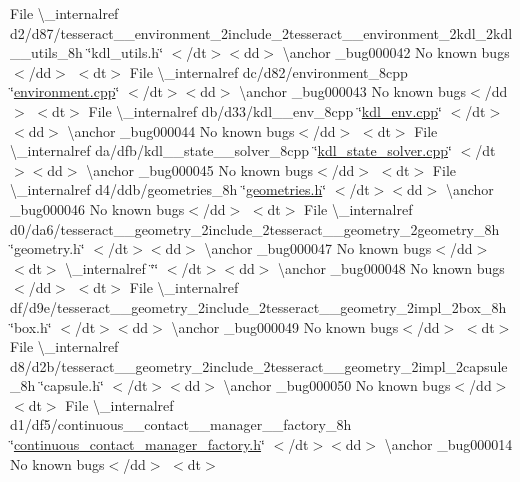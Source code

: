 \begin{DoxyRefList}
\+File \textbackslash{}\+\_\+internalref d2/d87/tesseract\+\_\+\+\_\+environment\+\_\+2include\+\_\+2tesseract\+\_\+\+\_\+environment\+\_\+2kdl\+\_\+2kdl\+\_\+\+\_\+utils\+\_\+8h \char`\"{}kdl\+\_\+utils.\+h\char`\"{} $<$/dt$>$$<$dd$>$ \textbackslash{}anchor \+\_\+bug000042 No known bugs$<$/dd$>$ $<$dt$>$
\+File \textbackslash{}\+\_\+internalref dc/d82/environment\+\_\+8cpp \char`\"{}\mbox{\hyperlink{environment_8cpp}{environment.\+cpp}}\char`\"{} $<$/dt$>$$<$dd$>$ \textbackslash{}anchor \+\_\+bug000043 No known bugs$<$/dd$>$ $<$dt$>$
\+File \textbackslash{}\+\_\+internalref db/d33/kdl\+\_\+\+\_\+env\+\_\+8cpp \char`\"{}\mbox{\hyperlink{kdl__env_8cpp}{kdl\+\_\+env.\+cpp}}\char`\"{} $<$/dt$>$$<$dd$>$ \textbackslash{}anchor \+\_\+bug000044 No known bugs$<$/dd$>$ $<$dt$>$
\+File \textbackslash{}\+\_\+internalref da/dfb/kdl\+\_\+\+\_\+state\+\_\+\+\_\+solver\+\_\+8cpp \char`\"{}\mbox{\hyperlink{kdl__state__solver_8cpp}{kdl\+\_\+state\+\_\+solver.\+cpp}}\char`\"{} $<$/dt$>$$<$dd$>$ \textbackslash{}anchor \+\_\+bug000045 No known bugs$<$/dd$>$ $<$dt$>$
\+File \textbackslash{}\+\_\+internalref d4/ddb/geometries\+\_\+8h \char`\"{}\mbox{\hyperlink{geometries_8h}{geometries.\+h}}\char`\"{} $<$/dt$>$$<$dd$>$ \textbackslash{}anchor \+\_\+bug000046 No known bugs$<$/dd$>$ $<$dt$>$
\+File \textbackslash{}\+\_\+internalref d0/da6/tesseract\+\_\+\+\_\+geometry\+\_\+2include\+\_\+2tesseract\+\_\+\+\_\+geometry\+\_\+2geometry\+\_\+8h \char`\"{}geometry.\+h\char`\"{} $<$/dt$>$$<$dd$>$ \textbackslash{}anchor \+\_\+bug000047 No known bugs$<$/dd$>$ $<$dt$>$
 \textbackslash{}\+\_\+internalref  \char`\"{}\char`\"{} $<$/dt$>$$<$dd$>$ \textbackslash{}anchor \+\_\+bug000048 No known bugs$<$/dd$>$ $<$dt$>$
\+File \textbackslash{}\+\_\+internalref df/d9e/tesseract\+\_\+\+\_\+geometry\+\_\+2include\+\_\+2tesseract\+\_\+\+\_\+geometry\+\_\+2impl\+\_\+2box\+\_\+8h \char`\"{}box.\+h\char`\"{} $<$/dt$>$$<$dd$>$ \textbackslash{}anchor \+\_\+bug000049 No known bugs$<$/dd$>$ $<$dt$>$
\+File \textbackslash{}\+\_\+internalref d8/d2b/tesseract\+\_\+\+\_\+geometry\+\_\+2include\+\_\+2tesseract\+\_\+\+\_\+geometry\+\_\+2impl\+\_\+2capsule\+\_\+8h \char`\"{}capsule.\+h\char`\"{} $<$/dt$>$$<$dd$>$ \textbackslash{}anchor \+\_\+bug000050 No known bugs$<$/dd$>$ $<$dt$>$
\+File \textbackslash{}\+\_\+internalref d1/df5/continuous\+\_\+\+\_\+contact\+\_\+\+\_\+manager\+\_\+\+\_\+factory\+\_\+8h \char`\"{}\mbox{\hyperlink{continuous__contact__manager__factory_8h}{continuous\+\_\+contact\+\_\+manager\+\_\+factory.\+h}}\char`\"{} $<$/dt$>$$<$dd$>$ \textbackslash{}anchor \+\_\+bug000014 No known bugs$<$/dd$>$ $<$dt$>$

\end{DoxyRefList}
